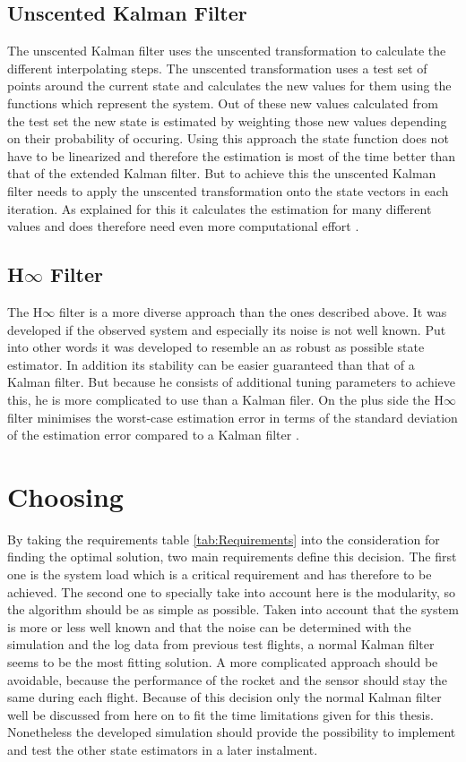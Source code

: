   \subsection{Unscented Kalman Filter}
  The unscented Kalman filter uses the unscented transformation to calculate the different interpolating steps.
  The unscented transformation uses a test set of points around the current state and calculates the new values for them using the functions which represent the system.
  Out of these new values calculated from the test set the new state is estimated by weighting those new values depending on their probability of occuring.
  Using this approach the state function does not have to be linearized and therefore the estimation is most of the time better than that of the extended Kalman filter.
  But to achieve this the unscented Kalman filter needs to apply the unscented transformation onto the state vectors in each iteration. 
  As explained for this it calculates the estimation for many different values
  and does therefore need even more computational effort \cite{SimonDan2006Ose:}.

  \subsection{H$\infty$ Filter}
  The H$\infty$ filter is a more diverse approach than the ones described above.
  It was developed if the observed system and especially its noise is not well known.
  Put into other words it was developed to resemble an as robust as possible state estimator.
  In addition its stability can be easier guaranteed than that of a Kalman filter.
  But because he consists of additional tuning parameters to achieve this, he is more complicated to use than a Kalman filer.
  On the plus side the H$\infty$ filter minimises the worst-case estimation error in terms of the standard deviation of the estimation error compared to a Kalman filter \cite{SimonDan2006Ose:}.

  \newpage
  \section{Choosing}
  By taking the requirements table \ref{tab:Requirements} into the consideration for finding
  the optimal solution, two main requirements define this decision.
  The first one is the system load which is a critical requirement and has therefore to be achieved.
  The second one to specially take into account here is the modularity, so the algorithm should be as simple as possible.
  Taken into account that the system is more or less well known and that the noise can be
  determined with the simulation and the log data from previous test flights,
  a normal Kalman filter seems to be the most fitting solution.
  A more complicated approach should be avoidable, because the performance of the rocket and the sensor should stay the same during
  each flight.
  Because of this decision only the normal Kalman filter well be discussed from here on to fit the time limitations given for this thesis.
  Nonetheless the developed simulation should provide the possibility to implement and test the other state estimators in a later instalment.

